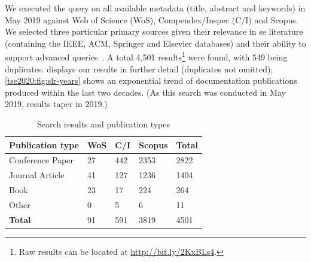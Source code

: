 We executed the query on all available metadata (title, abstract and keywords) in May 2019 against Web of Science  (WoS), Compendex/Inspec (C/I) and Scopus. We selected three particular primary sources given their relevance in \gls{se} literature (containing the IEEE, ACM, Springer and Elsevier databases) and their ability to support advanced queries~\citep{Brereton:2007by,Kitchenham:2007dd}. A total 4,501 results\footnote{Raw results can be located at \url{http://bit.ly/2KxBLs4}.} were found, with 549 being duplicates.  displays our results in further detail (duplicates not omitted); \cref{tse2020:fig:slr-years} shows an exponential trend of  documentation publications produced within the last two decades. (As this search was conducted in May 2019, results taper in 2019.)

\begin{table}[tb]
  \caption[Summary of search results in API documentation knowledge]{Search results and publication types}
  \label{tse2020:tab:search-results}
  \centering
  \begin{tabular}{l|lll|l}
    \toprule
    \textbf{Publication type} &
    \textbf{WoS} &
    \textbf{C/I} &
    \textbf{Scopus} &
    \textbf{Total} \\
    \midrule
    Conference Paper & 27 & 442 & 2353 & 2822 \\
    Journal Article & 41 & 127 & 1236 & 1404\\
    Book & 23 & 17 & 224 & 264\\
    Other & 0 & 5 & 6 & 11\\
    \midrule
    \textbf{Total} & 91 & 591 & 3819 & 4501\\
    \bottomrule
  \end{tabular}
\end{table}

